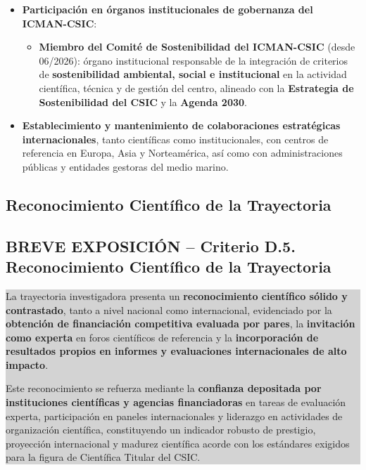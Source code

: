 \documentclass[11pt,a4paper]{article}
\newcommand{\breveexposicion}[2]{
    \subsection*{\color{darkgray}\textbf{BREVE EXPOSICIÓN -- #1}}
    \vspace{0.3em}
    \noindent\colorbox{lightgray}{%
        \begin{minipage}{0.97\textwidth}
        \vspace{0.5em}
        \color{darkgray}
        #2
        \vspace{0.5em}
        \end{minipage}
    }
    \vspace{1em}
}
\begin{document}
\begin{itemize}[leftmargin=*]
    \item \textbf{Participación en órganos institucionales de gobernanza del ICMAN-CSIC}:
    \begin{itemize}
        \item \textbf{Miembro del Comité de Sostenibilidad del ICMAN-CSIC} (desde 06/2026): órgano institucional responsable de la integración de criterios de \textbf{sostenibilidad ambiental, social e institucional} en la actividad científica, técnica y de gestión del centro, alineado con la \textbf{Estrategia de Sostenibilidad del CSIC} y la \textbf{Agenda 2030}.
    \end{itemize}

    \item \textbf{Establecimiento y mantenimiento de colaboraciones estratégicas internacionales}, tanto científicas como institucionales, con centros de referencia en Europa, Asia y Norteamérica, así como con administraciones públicas y entidades gestoras del medio marino.

\end{itemize}

\subsection{Reconocimiento Científico de la Trayectoria}

\breveexposicion{Criterio D.5. Reconocimiento Científico de la Trayectoria}{
La trayectoria investigadora presenta un \textbf{reconocimiento científico sólido y contrastado}, tanto a nivel nacional como internacional, evidenciado por la \textbf{obtención de financiación competitiva evaluada por pares}, la \textbf{invitación como experta} en foros científicos de referencia y la \textbf{incorporación de resultados propios en informes y evaluaciones internacionales de alto impacto}.

Este reconocimiento se refuerza mediante la \textbf{confianza depositada por instituciones científicas y agencias financiadoras} en tareas de evaluación experta, participación en paneles internacionales y liderazgo en actividades de organización científica, constituyendo un indicador robusto de prestigio, proyección internacional y madurez científica acorde con los estándares exigidos para la figura de Científica Titular del CSIC.
}
\end{document}
